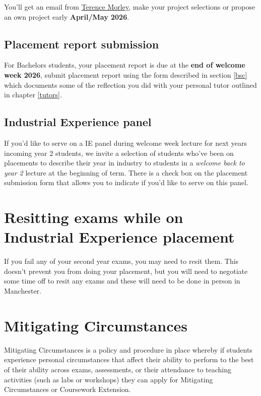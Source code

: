 \documentclass[
]{book}
\begin{document}
You'll get an email from \href{https://research.manchester.ac.uk/en/persons/terence.morley}{Terence Morley}, make your project selections or propose an own project early \textbf{April/May 2026}.

\subsection{Placement report submission}\label{five}

For Bachelors students, your placement report is due at the \textbf{end of welcome week 2026}, submit placement report using the form described in section \ref{bsc} which documents some of the reflection you did with your personal tutor outlined in chapter \ref{tutors}.

\subsection{Industrial Experience panel}\label{six}

If you'd like to serve on a IE panel during welcome week lecture for next years incoming year 2 students, we invite a selection of students who've been on placements to describe their year in industry to students in a \emph{welcome back to year 2} lecture at the beginning of term. There is a check box on the placement submission form that allows you to indicate if you'd like to serve on this panel.

\section{Resitting exams while on Industrial Experience placement}\label{resits}

If you fail any of your second year exams, you may need to resit them. This doesn't prevent you from doing your placement, but you will need to negotiate some time off to resit any exams and these will need to be done in person in Manchester. \citep{resits}

\section{Mitigating Circumstances}\label{mitcircs}

Mitigating Circumstances is a policy and procedure in place whereby if students experience personal circumstances that affect their ability to perform to the best of their ability across exams, assessments, or their attendance to teaching activities (such as labs or workshops) they can apply for Mitigating Circumstances or Coursework Extension. \citep{mitcircs}
\end{document}
